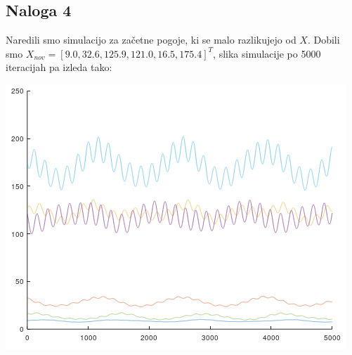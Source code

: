 \documentclass[a4paper, 12pt]{article}
\begin{document}
\subsection{Naloga 4}
Naredili smo simulacijo za začetne pogoje, ki se malo razlikujejo od $ X $. Dobili smo
$ X_{nov} = \left[9.0, 32.6, 125.9, 121.0, 16.5, 175.4\right]^{T} $, slika simulacije po 5000 iteracijah
pa izleda tako:\\
\begin{center}
	\includegraphics{stationary_almost.png}
\end{center}
\end{document}
